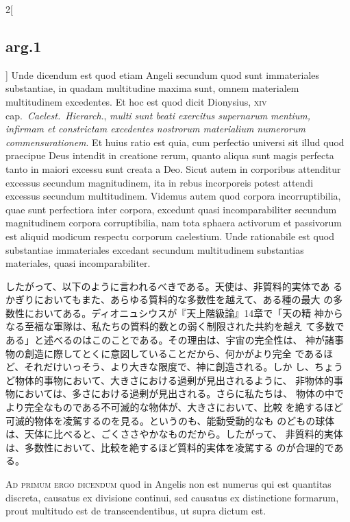 \documentclass[paper=a4paper,fontsize=10pt,jafontsize=9pt,titlepage]{jlreq}
\begin{document}
\begin{paracol}{2}[\subsection{arg.1}]
Unde dicendum est quod etiam Angeli secundum quod sunt immateriales
substantiae, in quadam multitudine maxima sunt, omnem materialem
multitudinem excedentes. Et hoc est quod dicit Dionysius, {\scshape
xiv} cap.~{\itshape Caelest.~Hierarch}., {\itshape multi sunt beati
exercitus supernarum mentium, infirmam et constrictam excedentes
nostrorum materialium numerorum commensurationem}. Et huius ratio est
quia, cum perfectio universi sit illud quod praecipue Deus intendit in
creatione rerum, quanto aliqua sunt magis perfecta tanto in maiori
excessu sunt creata a Deo. Sicut autem in corporibus attenditur
excessus secundum magnitudinem, ita in rebus incorporeis potest
attendi excessus secundum multitudinem. Videmus autem quod corpora
incorruptibilia, quae sunt perfectiora inter corpora, excedunt quasi
incomparabiliter secundum magnitudinem corpora corruptibilia, nam tota
sphaera activorum et passivorum est aliquid modicum respectu corporum
caelestium. Unde rationabile est quod substantiae immateriales
excedant secundum multitudinem substantias materiales, quasi
incomparabiliter.

\switchcolumn

したがって、以下のように言われるべきである。天使は、非質料的実体であ
 るかぎりにおいてもまた、あらゆる質料的な多数性を越えて、ある種の最大
 の多数性においてある。ディオニュシウスが『天上階級論』14章で「天の精
 神からなる至福な軍隊は、私たちの質料的数との弱く制限された共約を越え
 て多数である」と述べるのはこのことである。その理由は、宇宙の完全性は、
 神が諸事物の創造に際してとくに意図していることだから、何かがより完全
 であるほど、それだけいっそう、より大きな限度で、神に創造される。しか
 し、ちょうど物体的事物において、大きさにおける過剰が見出されるように、
 非物体的事物においては、多さにおける過剰が見出される。さらに私たちは、
 物体の中でより完全なものである不可滅的な物体が、大きさにおいて、比較
 を絶するほど可滅的物体を凌駕するのを見る。というのも、能動受動的なも
 のどもの球体は、天体に比べると、ごくささやかなものだから。したがって、
 非質料的実体は、多数性において、比較を絶するほど質料的実体を凌駕する
 のが合理的である。

\switchcolumn*[\subsection{ad.1}]

{\scshape Ad primum ergo dicendum} quod in Angelis non
est numerus qui est quantitas discreta, causatus ex divisione continui,
sed causatus ex distinctione formarum, prout multitudo est de
transcendentibus, ut supra dictum est.


\end{paracol}
\end{document}
